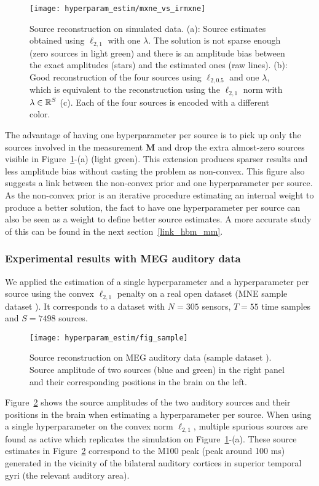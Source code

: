 \begin{figure}
	\texttt{[image: hyperparam\_estim/mxne\_vs\_irmxne]}
    \caption{Source reconstruction on simulated data. (a): Source estimates obtained using $\ell_{2,1}$ with one $\lambda$. The solution is not sparse enough (zero sources in light green) and there is an amplitude bias between the exact amplitudes (stars) and the estimated ones (raw lines). (b): Good reconstruction of the four sources using $\ell_{2,0.5}$ and one $\lambda$, which is equivalent to the reconstruction using the $\ell_{2,1}$ norm with $\lambda\in\mathbb{R}^S$ (c). Each of the four sources is encoded with a different color.
    }
    \label{fig:mxne_vs_irmxne}
\end{figure}

The advantage of having one hyperparameter per source is to pick up only the sources involved in the measurement $\mathbf{M}$ and drop the extra almost-zero sources visible in Figure~\ref{fig:mxne_vs_irmxne}-(a) (light green). This extension produces sparser results and less amplitude bias without casting the problem as non-convex. This figure also suggests a link between the non-convex prior and one hyperparameter per source. As the non-convex prior is an iterative procedure estimating an internal weight to produce a better solution, the fact to have one hyperparameter per source can also be seen as a weight to define better source estimates. A more accurate study of this can be found in the next section~\ref{link_hbm_mm}.


\subsubsection{Experimental results with MEG auditory data}

We applied the estimation of a single hyperparameter and a hyperparameter per source using the convex $\ell_{2,1}$ penalty on a real open dataset (MNE sample dataset \cite{mne}). It corresponds to a dataset with $N=305$ sensors, $T=55$ time samples and $S=7498$ sources. 
\begin{figure}
\texttt{[image: hyperparam\_estim/fig\_sample]}
    \caption{Source reconstruction on MEG auditory data (sample dataset \cite{mne}). Source amplitude of two sources (blue and green) in the right panel and their corresponding positions in the brain on the left. 
    }
    \label{fig:sample_data}
\end{figure}
Figure~\ref{fig:sample_data} shows the source amplitudes of the two auditory sources and their positions in the brain when estimating a hyperparameter per source. When using a single hyperparameter on the convex norm $\ell_{2,1}$, multiple spurious sources are found as active which replicates the simulation on Figure~\ref{fig:mxne_vs_irmxne}-(a). These source estimates in Figure~\ref{fig:sample_data} correspond to the M100 peak (peak around 100 ms) generated in the vicinity of the bilateral auditory cortices in superior temporal gyri (the relevant auditory area).


